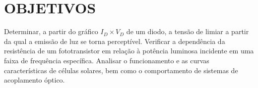 \section{OBJETIVOS}

\noindent\hspace{.3cm}Determinar, a partir do gráfico $I_D \times V_D$ de um diodo, a tensão de limiar a partir da qual a emissão de luz se torna perceptível. Verificar a dependência da resistência de um fototransistor em relação à potência luminosa incidente em uma faixa de frequência específica. Analisar o funcionamento e as curvas características de células solares, bem como o comportamento de sistemas de acoplamento óptico.

\vspace{.25cm}



